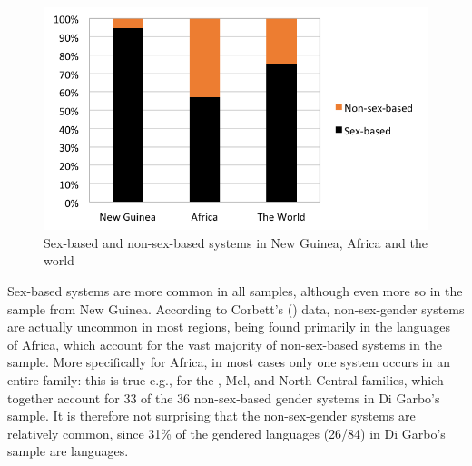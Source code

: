 \documentclass[output=collectionpaper]{langsci/langscibook}
\begin{document}
\begin{figure}
\includegraphics[width=.8\textwidth]{figures/09/fig7.png}
\caption{Sex-based and non-sex-based systems in New Guinea, Africa and the world}
\label{fig:Svard:7}




\end{figure}


Sex-based systems are more common in all samples, although even more so in the sample from New Guinea. According to Corbett's (\citeyear{Corbett2013a}) data, non-sex-gender systems are actually uncommon in most regions, being found primarily in the  languages of Africa, which account for the vast majority of non-sex-based systems in the sample. More specifically for Africa, in most cases only one system occurs in an entire family: this is true e.g., for the , Mel, and North-Central  families, which together account for 33 of the 36 non-sex-based gender systems in Di Garbo's sample. It is therefore not surprising that the non-sex-gender systems are relatively common, since 31\% of the gendered languages (26/84) in Di Garbo's sample are  languages.
\end{document}
